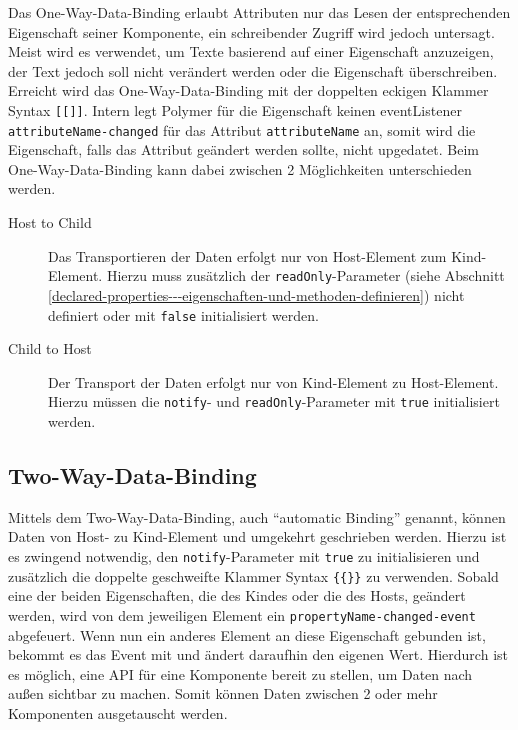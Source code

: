 Das One-Way-Data-Binding erlaubt Attributen nur das Lesen der entsprechenden Eigenschaft seiner Komponente, ein schreibender Zugriff wird jedoch untersagt. Meist wird es verwendet, um Texte basierend auf einer Eigenschaft anzuzeigen, der Text jedoch soll nicht verändert werden oder die Eigenschaft überschreiben. Erreicht wird das One-Way-Data-Binding mit der doppelten eckigen Klammer Syntax \texttt{{[}{[}{]}{]}}. Intern legt Polymer für die Eigenschaft keinen eventListener \texttt{attributeName-changed} für das Attribut \texttt{attributeName} an, somit wird die Eigenschaft, falls das Attribut geändert werden sollte, nicht upgedatet. Beim One-Way-Data-Binding kann dabei zwischen 2 Möglichkeiten unterschieden werden.

\begin{description}
  \item[Host to Child] Das Transportieren der Daten erfolgt nur von Host-Element zum Kind-Element. Hierzu muss zusätzlich der \texttt{readOnly}-Parameter (siehe Abschnitt \ref{declared-properties---eigenschaften-und-methoden-definieren}) nicht definiert oder mit \texttt{false} initialisiert werden.
  \item[Child to Host] Der Transport der Daten erfolgt nur von Kind-Element zu Host-Element. Hierzu müssen die \texttt{notify}- und \texttt{readOnly}-Parameter mit \texttt{true} initialisiert werden.
\end{description}


\subsection{Two-Way-Data-Binding}\label{two-way-data-binding}

Mittels dem Two-Way-Data-Binding, auch ``automatic Binding'' genannt, können Daten von Host- zu Kind-Element und umgekehrt geschrieben werden. Hierzu ist es zwingend notwendig, den \texttt{notify}-Parameter mit \texttt{true} zu initialisieren und zusätzlich die doppelte geschweifte Klammer Syntax \texttt{\{\{\}\}} zu verwenden. Sobald eine der beiden Eigenschaften, die des Kindes oder die des Hosts, geändert werden, wird von dem jeweiligen Element ein \texttt{propertyName-changed-event} abgefeuert. Wenn nun ein anderes Element an diese Eigenschaft gebunden ist, bekommt es das Event mit und ändert daraufhin den eigenen Wert. Hierdurch ist es möglich, eine \ac{API} für eine Komponente bereit zu stellen, um Daten nach außen sichtbar zu machen. Somit können Daten zwischen 2 oder mehr Komponenten ausgetauscht werden.


